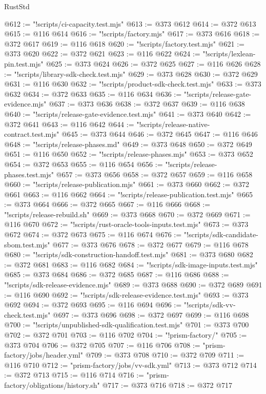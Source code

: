 \begin{lexlean}{RustStd}
\begin{coremodule}
@612 := "!scripts/ci-capacity.test.mjs"
@613 := @373 @612
@614 := @372 @613
@615 := @116 @614
@616 := "!scripts/factory.mjs"
@617 := @373 @616
@618 := @372 @617
@619 := @116 @618
@620 := "!scripts/factory.test.mjs"
@621 := @373 @620
@622 := @372 @621
@623 := @116 @622
@624 := "!scripts/lexlean-pin.test.mjs"
@625 := @373 @624
@626 := @372 @625
@627 := @116 @626
@628 := "!scripts/library-sdk-check.test.mjs"
@629 := @373 @628
@630 := @372 @629
@631 := @116 @630
@632 := "!scripts/product-sdk-check.test.mjs"
@633 := @373 @632
@634 := @372 @633
@635 := @116 @634
@636 := "!scripts/release-gate-evidence.mjs"
@637 := @373 @636
@638 := @372 @637
@639 := @116 @638
@640 := "!scripts/release-gate-evidence.test.mjs"
@641 := @373 @640
@642 := @372 @641
@643 := @116 @642
@644 := "!scripts/release-native-contract.test.mjs"
@645 := @373 @644
@646 := @372 @645
@647 := @116 @646
@648 := "!scripts/release-phases.md"
@649 := @373 @648
@650 := @372 @649
@651 := @116 @650
@652 := "!scripts/release-phases.mjs"
@653 := @373 @652
@654 := @372 @653
@655 := @116 @654
@656 := "!scripts/release-phases.test.mjs"
@657 := @373 @656
@658 := @372 @657
@659 := @116 @658
@660 := "!scripts/release-publication.mjs"
@661 := @373 @660
@662 := @372 @661
@663 := @116 @662
@664 := "!scripts/release-publication.test.mjs"
@665 := @373 @664
@666 := @372 @665
@667 := @116 @666
@668 := "!scripts/release-rebuild.sh"
@669 := @373 @668
@670 := @372 @669
@671 := @116 @670
@672 := "!scripts/rust-oracle-tools-inputs.test.mjs"
@673 := @373 @672
@674 := @372 @673
@675 := @116 @674
@676 := "!scripts/sdk-candidate-sbom.test.mjs"
@677 := @373 @676
@678 := @372 @677
@679 := @116 @678
@680 := "!scripts/sdk-construction-handoff.test.mjs"
@681 := @373 @680
@682 := @372 @681
@683 := @116 @682
@684 := "!scripts/sdk-image-inputs.test.mjs"
@685 := @373 @684
@686 := @372 @685
@687 := @116 @686
@688 := "!scripts/sdk-release-evidence.mjs"
@689 := @373 @688
@690 := @372 @689
@691 := @116 @690
@692 := "!scripts/sdk-release-evidence.test.mjs"
@693 := @373 @692
@694 := @372 @693
@695 := @116 @694
@696 := "!scripts/sdk-vv-check.test.mjs"
@697 := @373 @696
@698 := @372 @697
@699 := @116 @698
@700 := "!scripts/unpublished-sdk-qualification.test.mjs"
@701 := @373 @700
@702 := @372 @701
@703 := @116 @702
@704 := "!prism-factory/"
@705 := @373 @704
@706 := @372 @705
@707 := @116 @706
@708 := "prism-factory/jobs/header.yml"
@709 := @373 @708
@710 := @372 @709
@711 := @116 @710
@712 := "prism-factory/jobs/vv-sdk.yml"
@713 := @373 @712
@714 := @372 @713
@715 := @116 @714
@716 := "prism-factory/obligations/history.sh"
@717 := @373 @716
@718 := @372 @717

\end{coremodule}
\end{lexlean}
